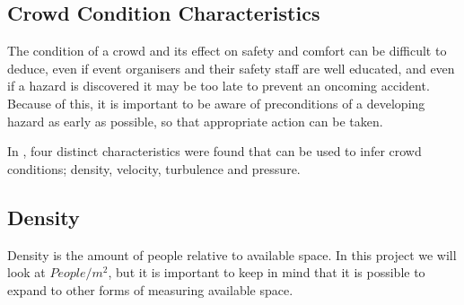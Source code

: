 




\subsection{Crowd Condition Characteristics}

The condition of a crowd and its effect on safety and comfort can be difficult to deduce, even if event organisers and their safety staff are well educated\cite{franke2015smart}, and even if a hazard is discovered it may be too late to prevent an oncoming accident. Because of this, it is important to be aware of preconditions of a developing hazard as early as possible, so that appropriate action can be taken.

In \citet{wirz2012inferring}, four distinct characteristics were found that can be used to infer crowd conditions; density, velocity, turbulence and pressure.

\subsection{Density}
Density is the amount of people relative to available space. In this project we will look at $People / m^2$, but it is important to keep in mind that it is possible to expand to other forms of measuring available space.

